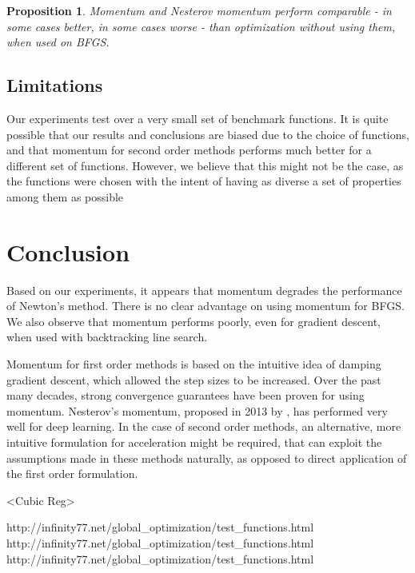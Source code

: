 \documentclass{article}
\newtheorem{prop}{Proposition}
\begin{document}
\begin{prop}
	Momentum and Nesterov momentum perform comparable - in some cases better, in some cases worse - than optimization without using them, when used on BFGS.
\end{prop}


\subsection{Limitations}
Our experiments test over a very small set of benchmark functions. It is quite possible that our results and conclusions are biased due to the choice of functions, and that momentum for second order methods performs much better for a different set of functions. However, we believe that this might not be the case, as the functions were chosen with the intent of having as diverse a set of properties among them as possible


\section{Conclusion}\label{conclusion}
Based on our experiments, it appears that momentum degrades the performance of Newton's method. There is no clear advantage on using momentum for BFGS. We also observe that momentum performs poorly, even for gradient descent, when used with backtracking line search.

Momentum for first order methods is based on the intuitive idea of damping gradient descent, which allowed the step sizes to be increased. Over the past many decades, strong convergence guarantees have been proven for using momentum. Nesterov's momentum, proposed in 2013 by \citet{Sutskever}, has performed very well for deep learning. In the case of second order methods, an alternative, more intuitive formulation for acceleration might be required, that can exploit the assumptions made in these methods naturally, as opposed to direct application of the first order formulation.

<Cubic Reg>

http://infinity77.net/global\_optimization/test\_functions.html
http://infinity77.net/global\_optimization/test\_functions.html
http://infinity77.net/global\_optimization/test\_functions.html


\end{document}
